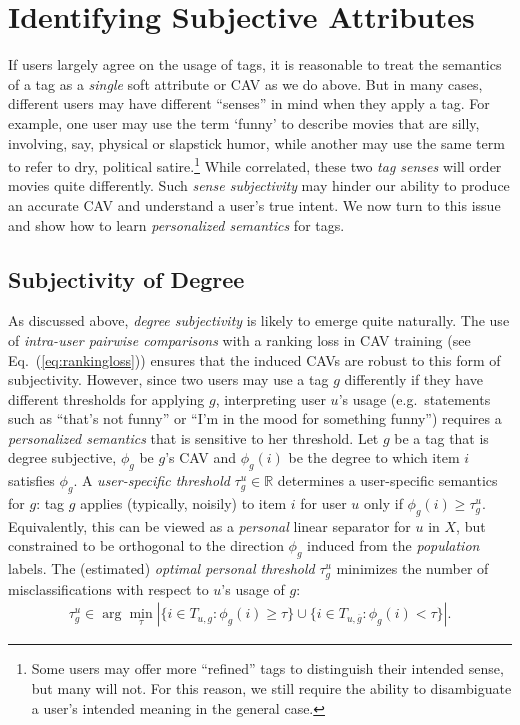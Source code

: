 \documentclass[manuscript,screen,nonacm]{acmart}
\newcommand{\R}{\mathbb{R}}
\newcommand{\1}{{\mathbf 1}}
\newcommand{\olg}{\overline{g}}
\theoremstyle{TheoremNum}
\begin{document}
\section{Identifying Subjective Attributes}
\label{sec:subjectiveCAVs}

If users largely agree on the usage of tags, it is reasonable to treat the semantics of a tag as a \emph{single} soft attribute or CAV as we do above.
But in many cases, different users may have different ``senses'' in mind when they apply a tag. For example, one user may use the term `funny' to describe  movies that are silly, involving, say, physical or slapstick humor, while another may use the same term to refer to dry, political satire.\footnote{Some users may offer more ``refined'' tags to distinguish their intended sense, but many will not. For this reason, we still require the ability to disambiguate a user's intended meaning in the general case.}
While correlated, these two \emph{tag senses} will order movies quite differently. Such \emph{sense subjectivity} may hinder our ability to produce an accurate CAV and understand a user's true intent. We now turn to this issue and show how to learn \emph{personalized semantics} for tags.

\subsection{Subjectivity of Degree}
\label{sec:subjectiveDegree}

As discussed above, \emph{degree subjectivity} is likely to emerge quite naturally. The use of \emph{intra-user pairwise comparisons} with a ranking loss in CAV training (see Eq.~(\ref{eq:rankingloss})) ensures that the induced CAVs are robust to this form of subjectivity. However, since two users may use a tag $g$ differently if they have different thresholds for applying $g$, interpreting user $u$'s usage (e.g.\ statements such as ``that's not funny'' or ``I'm in the mood for something funny'') requires a \emph{personalized semantics} that is sensitive to her threshold. %
Let $g$ be a tag that is degree subjective, $\phi_g$ be $g$'s CAV and $\phi_g(i)$ be the degree to which item $i$ satisfies $\phi_g$. A \emph{user-specific threshold} $\tau^u_g \in \R$ determines a user-specific semantics for $g$: tag $g$ applies (typically, noisily) to item $i$ for user $u$ only if $\phi_g(i) \geq \tau^u_g$. Equivalently, this can be viewed as a \emph{personal} linear separator for $u$ in $X$, but constrained to be orthogonal to the direction $\phi_g$ induced from the \emph{population} labels. The (estimated) \emph{optimal personal threshold} $\tau^u_g$ minimizes the number of misclassifications with respect to $u$'s usage of $g$:
\begin{align}
\tau^u_g \in \arg\min_\tau |\{i\in T_{u,g} : \phi_g(i) \geq \tau\} \cup \{i\in T_{u,\olg} : \phi_g(i) < \tau\}|.
\end{align}
\end{document}
